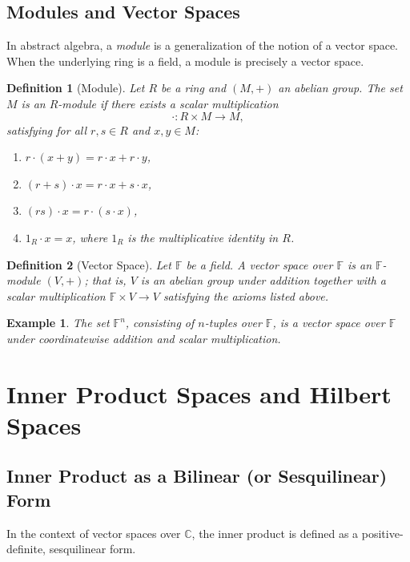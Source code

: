 \documentclass[11pt,oneside]{book}
\newtheorem{definition}{Definition}[chapter]
\newtheorem{example}{Example}[chapter]
\theoremstyle{remark}
\begin{document}
	\section{Modules and Vector Spaces}
	In abstract algebra, a \emph{module} is a generalization of the notion of a vector space. When the underlying ring is a field, a module is precisely a vector space.
	
	\begin{definition}[Module]
		Let $R$ be a ring and $(M,+)$ an abelian group. The set $M$ is an \emph{$R$-module} if there exists a scalar multiplication 
		\[
		\cdot : R \times M \to M,
		\]
		satisfying for all $r,s\in R$ and $x,y\in M$:
		\begin{enumerate}[label=(\alph*)]
			\item $r\cdot (x+y) = r\cdot x + r\cdot y$,
			\item $(r+s)\cdot x = r\cdot x + s\cdot x$,
			\item $(rs)\cdot x = r\cdot (s\cdot x)$,
			\item $1_R \cdot x = x$, where $1_R$ is the multiplicative identity in $R$.
		\end{enumerate}
	\end{definition}
	
	\begin{definition}[Vector Space]
		Let $\mathbb{F}$ be a field. A \emph{vector space} over $\mathbb{F}$ is an $\mathbb{F}$-module $(V,+)$; that is, $V$ is an abelian group under addition together with a scalar multiplication $\mathbb{F}\times V\to V$ satisfying the axioms listed above.
	\end{definition}
	
	\begin{example}
		The set $\mathbb{F}^n$, consisting of $n$-tuples over $\mathbb{F}$, is a vector space over $\mathbb{F}$ under coordinatewise addition and scalar multiplication.
	\end{example}
	
	\chapter{Inner Product Spaces and Hilbert Spaces}
	\section{Inner Product as a Bilinear (or Sesquilinear) Form}
	In the context of vector spaces over $\mathbb{C}$, the inner product is defined as a positive-definite, sesquilinear form.
	
\end{document}
